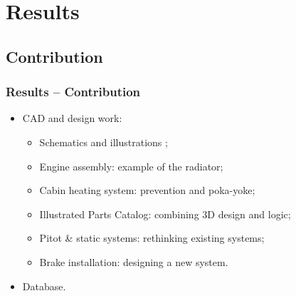 \documentclass{beamer}
\begin{document}



\section{Results}
\subsection{Contribution}

\begin{frame}\frametitle{Results -- Contribution}
\begin{itemize}
\item CAD and design work:
\begin{itemize}
\item Schematics and illustrations ;
\item Engine assembly: example of the radiator;
\item Cabin heating system: prevention and poka-yoke;
\item Illustrated Parts Catalog: combining 3D design and logic;
\item Pitot \& static systems: rethinking existing systems;
\item Brake installation: designing a new system.
\end{itemize}
\item Database.
\end{itemize}
\end{frame}
\end{document}
